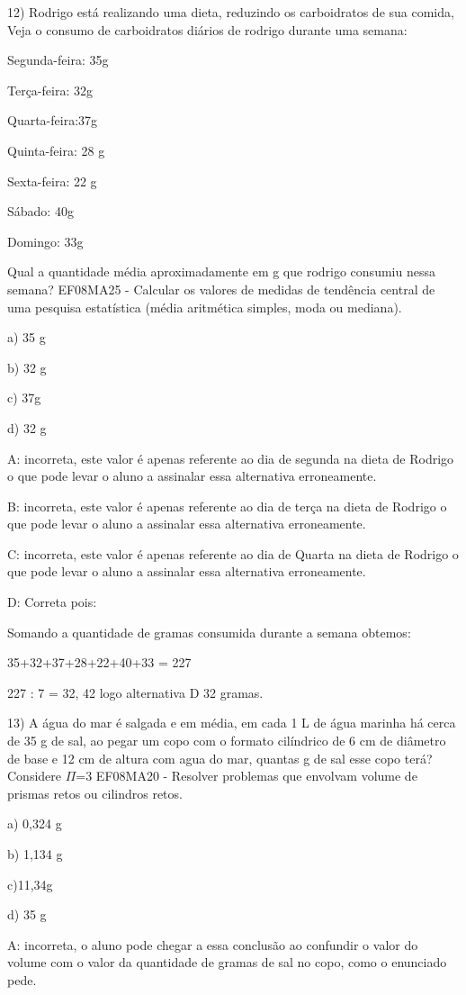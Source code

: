 12) Rodrigo está realizando uma dieta, reduzindo os carboidratos de sua
comida, Veja o consumo de carboidratos diários de rodrigo durante uma
semana:

Segunda-feira: 35g

Terça-feira: 32g

Quarta-feira:37g

Quinta-feira: 28 g

Sexta-feira: 22 g

Sábado: 40g

Domingo: 33g

Qual a quantidade média aproximadamente em g que rodrigo consumiu nessa
semana? EF08MA25 - Calcular os valores de medidas de tendência central
de uma pesquisa estatística (média aritmética simples, moda ou mediana).

a) 35 g

b) 32 g

c) 37g

d) 32 g

A: incorreta, este valor é apenas referente ao dia de segunda na dieta
de Rodrigo o que pode levar o aluno a assinalar essa alternativa
erroneamente.

B: incorreta, este valor é apenas referente ao dia de terça na dieta de
Rodrigo o que pode levar o aluno a assinalar essa alternativa
erroneamente.

C: incorreta, este valor é apenas referente ao dia de Quarta na dieta de
Rodrigo o que pode levar o aluno a assinalar essa alternativa
erroneamente.

D: Correta pois:

Somando a quantidade de gramas consumida durante a semana obtemos:

35+32+37+28+22+40+33 = 227

227 : 7 = 32, 42 logo alternativa D 32 gramas.

13) A água do mar é salgada e em média, em cada 1 L de água marinha há
cerca de 35 g de sal, ao pegar um copo com o formato cilíndrico de 6 cm
de diâmetro de base e 12 cm de altura com agua do mar, quantas g de sal
esse copo terá? Considere \(\Pi\)=3 EF08MA20 - Resolver problemas que
envolvam volume de prismas retos ou cilindros retos.

a) 0,324 g

b) 1,134 g

c)11,34g

d) 35 g

A: incorreta, o aluno pode chegar a essa conclusão ao confundir o valor
do volume com o valor da quantidade de gramas de sal no copo, como o
enunciado pede.

